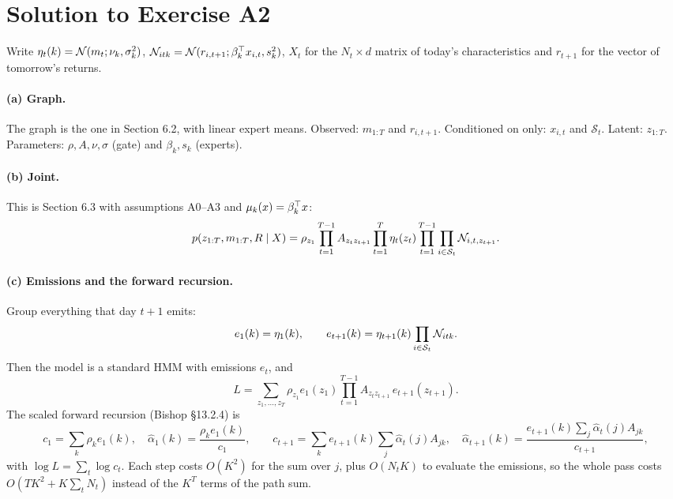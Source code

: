 \section{Solution to Exercise A2}

Write $\eta_t(k)=\mathcal{N}(m_t;\nu_k,\sigma_k^2)$, $\mathcal{N}_{itk}=\mathcal{N}(r_{i,t+1};\beta_k^{\top} x_{i,t},s_k^2)$, $X_t$ for the $N_t\times d$ matrix of today's characteristics and $r_{t+1}$ for the vector of tomorrow's returns.

\paragraph{(a) Graph.} The graph is the one in Section 6.2, with linear expert means. Observed: $m_{1:T}$ and $r_{i,t+1}$. Conditioned on only: $x_{i,t}$ and $\mathcal S_t$. Latent: $z_{1:T}$. Parameters: $\rho,A,\nu,\sigma$ (gate) and $\beta_k,s_k$ (experts).

\paragraph{(b) Joint.} This is Section 6.3 with assumptions A0--A3 and $\mu_k(x)=\beta_k^{\top} x$:
\begin{equation}
p(z_{1:T},m_{1:T},R\mid X)=\rho_{z_1}\prod_{t=1}^{T-1}A_{z_tz_{t+1}}\prod_{t=1}^T\eta_t(z_t)\prod_{t=1}^{T-1}\prod_{i\in\mathcal S_t}\mathcal{N}_{i,t,z_{t+1}}.
\end{equation}

\paragraph{(c) Emissions and the forward recursion.} Group everything that day $t+1$ emits:
\begin{equation}
e_1(k)=\eta_1(k),\qquad e_{t+1}(k)=\eta_{t+1}(k)\prod_{i\in\mathcal S_t}\mathcal{N}_{itk}.
\end{equation}
Then the model is a standard HMM with emissions $e_t$, and
\begin{equation}
L=\sum_{z_1,\dots,z_T}\rho_{z_1}e_1(z_1)\prod_{t=1}^{T-1}A_{z_tz_{t+1}}\,e_{t+1}(z_{t+1}).
\end{equation}
The scaled forward recursion (Bishop \S13.2.4) is
\begin{equation}
c_1=\sum_k\rho_ke_1(k),\quad\hat\alpha_1(k)=\frac{\rho_ke_1(k)}{c_1},\qquad c_{t+1}=\sum_ke_{t+1}(k)\sum_j\hat\alpha_t(j)A_{jk},\quad\hat\alpha_{t+1}(k)=\frac{e_{t+1}(k)\sum_j\hat\alpha_t(j)A_{jk}}{c_{t+1}},
\end{equation}
with $\log L=\sum_t\log c_t$. Each step costs $O(K^2)$ for the sum over $j$, plus $O(N_tK)$ to evaluate the emissions, so the whole pass costs $O(TK^2+K\sum_tN_t)$ instead of the $K^T$ terms of the path sum.

